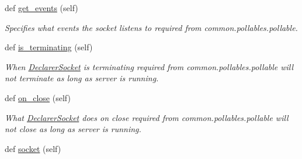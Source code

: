 \begin{DoxyCompactItemize}
def \hyperlink{class_r_a_i_d5_1_1block__device_1_1pollables_1_1declarer__socket_1_1_declarer_socket_af352950a82cb5b16a342af8025a29c8a}{get\+\_\+events} (self)
\begin{DoxyCompactList}\small\item\em Specifies what events the socket listens to required from common.\+pollables.\+pollable. \end{DoxyCompactList}\item 
\mbox{\label{class_r_a_i_d5_1_1block__device_1_1pollables_1_1declarer__socket_1_1_declarer_socket_a1dd67d80155aa3136dfcc719c9b3977d}} 
def \hyperlink{class_r_a_i_d5_1_1block__device_1_1pollables_1_1declarer__socket_1_1_declarer_socket_a1dd67d80155aa3136dfcc719c9b3977d}{is\+\_\+terminating} (self)
\begin{DoxyCompactList}\small\item\em When \hyperlink{class_r_a_i_d5_1_1block__device_1_1pollables_1_1declarer__socket_1_1_declarer_socket}{Declarer\+Socket} is terminating required from common.\+pollables.\+pollable will not terminate as long as server is running. \end{DoxyCompactList}\item 
\mbox{\label{class_r_a_i_d5_1_1block__device_1_1pollables_1_1declarer__socket_1_1_declarer_socket_ade8b017d1d5495b3389205af00303067}} 
def \hyperlink{class_r_a_i_d5_1_1block__device_1_1pollables_1_1declarer__socket_1_1_declarer_socket_ade8b017d1d5495b3389205af00303067}{on\+\_\+close} (self)
\begin{DoxyCompactList}\small\item\em What \hyperlink{class_r_a_i_d5_1_1block__device_1_1pollables_1_1declarer__socket_1_1_declarer_socket}{Declarer\+Socket} does on close required from common.\+pollables.\+pollable will not close as long as server is running. \end{DoxyCompactList}\item 
\mbox{\label{class_r_a_i_d5_1_1block__device_1_1pollables_1_1declarer__socket_1_1_declarer_socket_ae5cf6477968fe119eed756e117ed2db2}} 
def \hyperlink{class_r_a_i_d5_1_1block__device_1_1pollables_1_1declarer__socket_1_1_declarer_socket_ae5cf6477968fe119eed756e117ed2db2}{socket} (self)

\end{DoxyCompactItemize}
